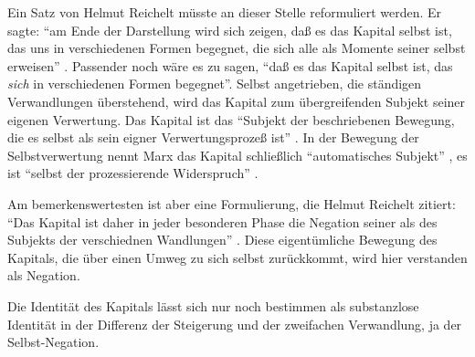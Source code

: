 \documentclass[12pt,
               DIV13,
               paper=a4,
               twoside=false,
               onehalfspacing,
               bibliography=totoc,
               toc=graduated,
               draft,
               ]{scrartcl}
\newcommand{\pc}[2]{\parencite[#1]{#2}}
\newcommand{\zn}[3]{\parencite[#1, zit. nach][#2]{#3}}
\newcommand{\worries}[1]{\ifdraft{\textcolor{blue}{\texttt{(#1)}}}{}}
\begin{document}

Ein Satz von Helmut Reichelt müsste an dieser Stelle reformuliert
werden. Er sagte: "`am Ende der Darstellung wird sich zeigen, daß es
das Kapital selbst ist, das uns in verschiedenen Formen begegnet, die
sich alle als Momente seiner selbst erweisen"' \pc{181}{reichelt}.
Passender noch wäre es zu sagen, "`daß es das Kapital selbst ist, das
\emph{sich} in verschiedenen Formen begegnet"'. Selbst angetrieben,
die ständigen Verwandlungen überstehend, wird das Kapital zum
übergreifenden Subjekt seiner eigenen Verwertung. Das Kapital ist das
"`Subjekt der beschriebenen Bewegung, die es selbst als sein eigner
Verwertungsprozeß ist"' \zn{Marx}{181}{reichelt}. In der Bewegung der
Selbstverwertung nennt Marx das Kapital schließlich "`automatisches
Subjekt"' \pc{169}{kap}, es ist "`selbst der prozessierende
Widerspruch"' \pc{601}{grundr}.






Am bemerkenswertesten ist aber eine Formulierung, die Helmut Reichelt
zitiert: "`Das Kapital ist daher in jeder besonderen Phase die
Negation seiner als des Subjekts der verschiednen Wandlungen"'
\zn{Marx}{181}{reichelt}. Diese eigentümliche Bewegung des Kapitals,
die über einen Umweg zu sich selbst zurückkommt, wird hier verstanden
als Negation.

Die Identität des Kapitals lässt sich nur noch bestimmen als
substanzlose Identität in der Differenz der Steigerung und der
zweifachen Verwandlung, ja der Selbst-Negation. \worries{?}

\end{document}
